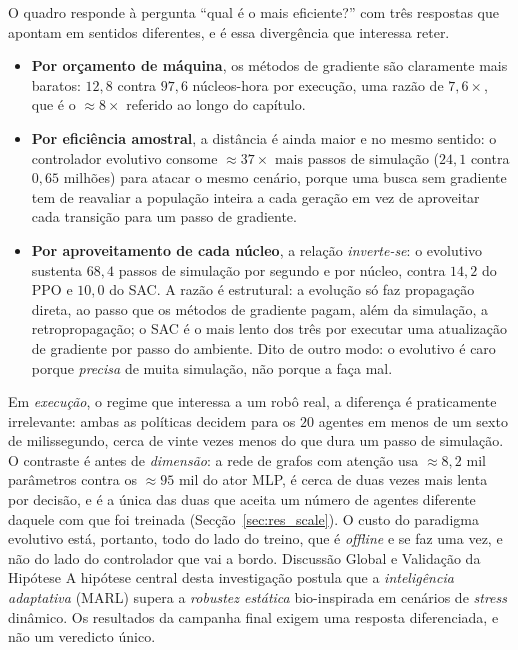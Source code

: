 \documentclass[12pt,reqno, twoside]{amsbook}
\makeatletter
\def\section{\@startsection{section}{1}%
      \z@{.5\linespacing\@plus.7\linespacing}{.25\linespacing}%
      {\normalfont\bfseries\flushleft}}
\theoremstyle{plain}
\numberwithin{equation}{chapter}
\numberwithin{section}{chapter}
\numberwithin{table}{chapter}
\numberwithin{figure}{chapter}
\makeatother
\begin{document}
O quadro responde à pergunta ``qual é o mais eficiente?'' com três respostas que apontam em sentidos diferentes, e é essa divergência que interessa reter.
\begin{itemize}
    \item \textbf{Por orçamento de máquina}, os métodos de gradiente são claramente mais baratos: $12{,}8$ contra $97{,}6$ núcleos-hora por execução, uma razão de $7{,}6\times$, que é o $\approx 8\times$ referido ao longo do capítulo.
    \item \textbf{Por eficiência amostral}, a distância é ainda maior e no mesmo sentido: o controlador evolutivo consome $\approx 37\times$ mais passos de simulação ($24{,}1$ contra $0{,}65$ milhões) para atacar o mesmo cenário, porque uma busca sem gradiente tem de reavaliar a população inteira a cada geração em vez de aproveitar cada transição para um passo de gradiente.
    \item \textbf{Por aproveitamento de cada núcleo}, a relação \emph{inverte-se}: o evolutivo sustenta $68{,}4$ passos de simulação por segundo e por núcleo, contra $14{,}2$ do PPO e $10{,}0$ do SAC. A razão é estrutural: a evolução só faz propagação direta, ao passo que os métodos de gradiente pagam, além da simulação, a retropropagação; o SAC é o mais lento dos três por executar uma atualização de gradiente por passo do ambiente. Dito de outro modo: o evolutivo é caro porque \emph{precisa} de muita simulação, não porque a faça mal.
\end{itemize}

Em \emph{execução}, o regime que interessa a um robô real, a diferença é praticamente irrelevante: ambas as políticas decidem para os $20$ agentes em menos de um sexto de milissegundo, cerca de vinte vezes menos do que dura um passo de simulação. O contraste é antes de \emph{dimensão}: a rede de grafos com atenção usa $\approx 8{,}2$ mil parâmetros contra os $\approx 95$ mil do ator MLP, é cerca de duas vezes mais lenta por decisão, e é a única das duas que aceita um número de agentes diferente daquele com que foi treinada (Secção~\ref{sec:res_scale}). O custo do paradigma evolutivo está, portanto, todo do lado do treino, que é \textit{offline} e se faz uma vez, e não do lado do controlador que vai a bordo.
\section{Discussão Global e Validação da Hipótese}
\label{sec:res_discussao}
A hipótese central desta investigação postula que a \emph{inteligência adaptativa} (MARL) supera a \emph{robustez estática} bio-inspirada em cenários de \textit{stress} dinâmico. Os resultados da campanha final exigem uma resposta diferenciada, e não um veredicto único.
\end{document}
